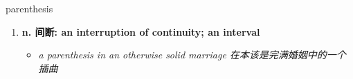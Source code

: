 
\begin{frame}
{\huge parenthesis}
\begin{center}
\begin{enumerate}\Large
  \item \textbf{n. 间断: an interruption of continuity; an interval}
  \begin{itemize}
    \item \em{\Large{a parenthesis in an otherwise solid marriage 在本该是完满婚姻中的一个插曲}}
  \end{itemize}
\end{enumerate}
\end{center}
\end{frame}
